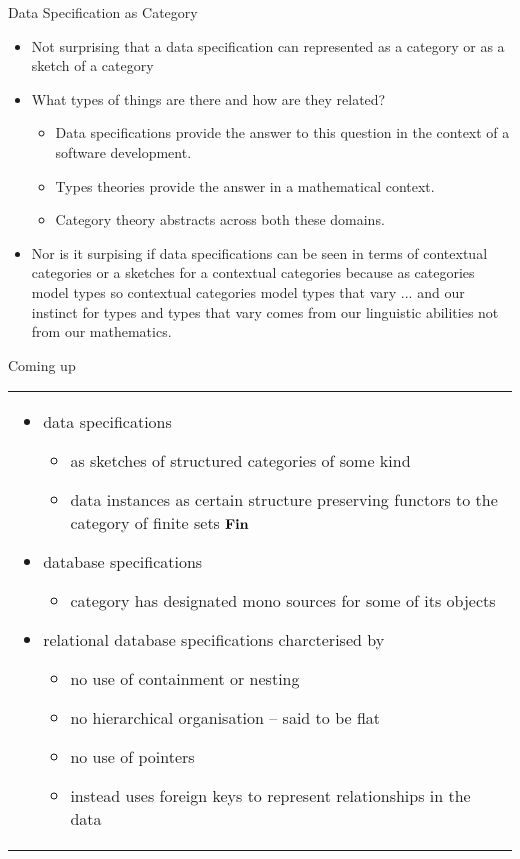 \begin{frame}{Data Specification as Category}
\begin{itemize}
 \item Not surprising that a data specification can represented as a category or as a sketch of a category
\pause \item
What types of things are there and how are they related? 
\begin{itemize}
\item Data specifications provide the answer to this question in the context of a software development. 
\item Types theories provide the answer in a mathematical context. 
\item Category theory abstracts across both these domains.
\end{itemize}
\pause \item Nor is it surpising if data specifications can be seen in terms
of contextual categories or a sketches for a contextual categories
because as categories model types so contextual categories model types that vary
\pause ... and  our instinct for types and types that vary comes from our linguistic abilities not from our mathematics.
\end{itemize}
\end{frame}

\begin{frame}{Coming up}
\begin{center}
\begin{tabular}{p{12cm}}
\begin{itemize}
    \item data specifications 
    \begin{itemize}
        \item as sketches of structured categories of some kind
        \item data instances as certain structure preserving functors to the category of finite sets $\textbf{Fin}$
    \end{itemize}
    \item database specifications
    \begin{itemize}
         \item category has designated mono sources for some of its objects 
    \end{itemize}
    \item relational database specifications charcterised by
    \begin{itemize}
         \item no use of containment or nesting
         \item no  hierarchical organisation -- said to be flat
         \item no use of pointers 
         \item instead uses foreign keys to represent relationships in the data
    \end{itemize}
\end{itemize} 
\end{tabular}
\end{center}
\end{frame}


